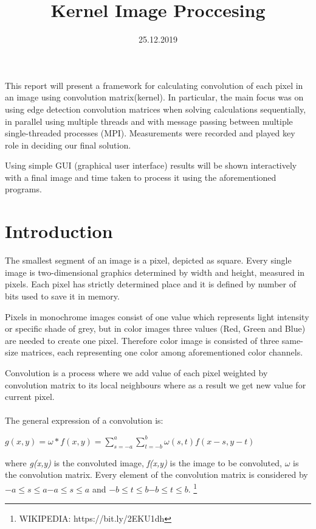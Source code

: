 \documentclass{article}
\title{ \textbf{ Kernel Image Proccesing} }
\author{ \textbf{ Elmir Šut} \\ \href \\ \href UP FAMNIT \\ \href{E-mail:\textit{elmirsutisz@gmail.com} }}
\begin{document}
\twocolumn
\date{25.12.2019}
\maketitle

\begin{textit}

{This report will present a framework for calculating convolution of each pixel in an image using convolution matrix(kernel). In particular, the main focus was on using edge detection convolution matrices when solving calculations sequentially, in parallel using multiple threads and with
message passing between multiple single-threaded processes (MPI). Measurements were recorded and played key role in deciding our final solution. 

Using simple GUI (graphical user interface) results will be shown interactively with a final image and time taken to process it using  the aforementioned programs.}
 
\end{textit}

\section{Introduction}

The smallest segment of an image is a pixel, depicted as square. Every single image is two-dimensional graphics determined by width and height, measured in pixels. Each pixel has strictly determined place and it is defined by number of bits used to save it in memory.  

Pixels in monochrome images  consist of one value which represents light intensity or specific shade of grey, but in color images three values (Red, Green and Blue) are needed to create one pixel. Therefore color image is consisted of three same-size matrices, each representing one color among aforementioned color channels.

Convolution is a process  where we add value of each pixel weighted by convolution matrix to its local neighbours where as a result we get new value for current pixel.\\
\\
The general expression of a convolution is: 


 $
{\displaystyle g(x,y)=\omega *f(x,y)=\sum _{s=-a}^{a}{\sum _{t=-b}^{b}{\omega (s,t)f(x-s,y-t)}}} 
 $
 
 
where  \textit{g(x,y)}  is the convoluted image, \textit{f(x,y)}  \justify is the image to be convoluted, $ \omega $ is the convolution matrix. Every element of the convolution matrix is considered by $  {\displaystyle -a\leq s\leq a}{\displaystyle -a\leq s\leq a} $ and ${\displaystyle -b\leq t\leq b}{\displaystyle -b\leq t\leq b}.$ \footnote{WIKIPEDIA: https://bit.ly/2EKU1dh}\\
\end{document}

